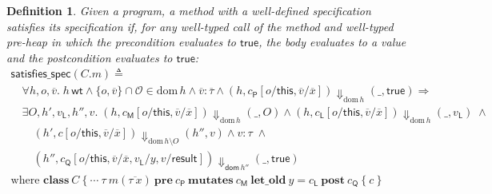 \documentclass{article}
\newtheorem{definition}{Definition}
\begin{document}
\begin{definition}
Given a program, a method with a well-defined specification \emph{satisfies its specification} if, for any well-typed call of the method and well-typed pre-heap in which the precondition evaluates to $\mathsf{true}$, the body evaluates to a value and the postcondition evaluates to $\mathsf{true}$:
$$\begin{array}{l}
\mathsf{satisfies\_spec}(C.m) \triangleq\\
\quad \forall h, o, \overline{v}.\;h\,\mathsf{wt} \land \{o, \overline{v}\} \cap \mathcal{O} \in \mathrm{dom}\,h \land \overline{v} : \overline{\tau} \land (h, c_\mathsf{P}[o/\mathsf{this},\overline{v}/\overline{x}]) \Downarrow_{\mathrm{dom}\,h} (\_, \mathsf{true}) \Rightarrow\\
\quad \exists O, h', v_\mathsf{L}, h'', v.\;(h, c_\mathsf{M}[o/\mathsf{this},\overline{v}/\overline{x}]) \Downarrow_{\mathrm{dom}\,h} (\_, O) \land (h, c_\mathsf{L}[o/\mathsf{this},\overline{v}/\overline{x}]) \Downarrow_{\mathrm{dom}\,h} (\_, v_\mathsf{L})\;\land\\
\quad\quad (h', c[o/\mathsf{this},\overline{v}/\overline{x}]) \Downarrow_{\mathrm{dom}\,h\setminus O} (h'', v) \land v : \tau\;\land\\
\quad\quad (h'', c_\mathsf{Q}[o/\mathsf{this},\overline{v}/\overline{x}, v_\mathsf{L}/y, v/\mathsf{result}]) \Downarrow_{\mathsf{dom}\,h''} (\_, \mathsf{true})\\
\textrm{where $\mathbf{class}\ C\ \{\ \cdots\ \tau\ m(\overline{\tau\ x})\ \mathbf{pre}\ c_\mathsf{P}\ \mathbf{mutates}\ c_\mathsf{M}\ \mathbf{let\_old}\ y = c_\mathsf{L}\ \mathbf{post}\ c_\mathsf{Q}\ \{\ c\ \}$}
\end{array}$$
\end{definition}
\end{document}
